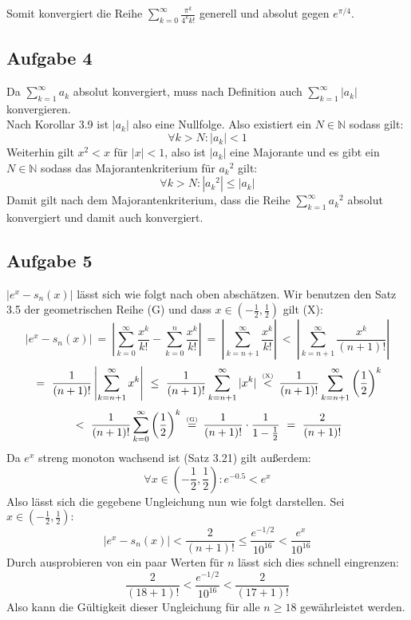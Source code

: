 \documentclass[a4paper,graphics,11pt]{article}
\newcommand{\aufgabe}[1]{\subsection*{Aufgabe #1}}
\newcommand{\up}[2]{\mathrel{\overset{\makebox[0pt]{\mbox{\normalfont\tiny #2}}}{#1}}}
\begin{document}
Somit konvergiert die Reihe $\displaystyle\sum_{k=0}^{\infty} \frac{\pi^k}{4^kk!}$ generell
und absolut gegen $e^{\pi/4}$.
\newpage
\aufgabe{4}
Da $\sum_{k=1}^{\infty} a_k$ absolut konvergiert, muss nach Definition auch
$\sum_{k=1}^{\infty} |a_k|$ konvergieren.\\
Nach Korollar 3.9 ist $|a_k|$ also eine Nullfolge.
Also existiert ein $N \in \mathbb{N}$ sodass gilt:
$$
    \forall k > N \colon |a_k| < 1
$$
Weiterhin gilt $x^2 < x$ für $|x| < 1$, also ist $|a_k|$ eine Majorante und es gibt ein
$N \in \mathbb{N}$ sodass das Majorantenkriterium für ${a_k}^2$ gilt:
$$
    \forall k > N \colon |{a_k}^2| \leq |a_k|
$$
Damit gilt nach dem Majorantenkriterium, dass die Reihe $\sum_{k=1}^{\infty} {a_k}^2$
absolut konvergiert und damit auch konvergiert.
\aufgabe{5}
$|e^x - s_n(x)|$ lässt sich wie folgt 
nach oben abschätzen. Wir benutzen den Satz 3.5 der geometrischen Reihe (G) und
dass $x\in \left(-\frac{1}{2},\frac{1}{2}\right)$ gilt (X):
$$
    |e^x-s_n(x)|
    \ =\ \left|\sum_{k=0}^{\infty} \frac{x^k}{k!} - \sum_{k=0}^{n} \frac{x^k}{k!}\right|
    \ =\ \left|\sum_{k=n+1}^{\infty} \frac{x^k}{k!}\right|
    \ <\ \left|\sum_{k=n+1}^{\infty} \frac{x^k}{(n+1)!}\right|
$$$$
    \ =\ \frac{1}{(n+1)!} \left|\sum_{k=n+1}^{\infty} x^k\right|
    \ \leq\ \frac{1}{(n+1)!} \sum_{k=n+1}^{\infty} |x^k|
    \up{\ <\ }{(X)}\frac{1}{(n+1)!} \sum_{k=n+1}^{\infty} \left(\frac{1}{2}\right)^k
$$$$
    \ <\ \frac{1}{(n+1)!} \sum_{k=0}^{\infty} \left(\frac{1}{2}\right)^k
    \up{\ =\ }{(G)}\frac{1}{(n+1)!}\cdot \frac{1}{1-\frac{1}{2}}
    \ =\ \frac{2}{(n+1)!}
$$
Da $e^x$ streng monoton wachsend ist (Satz 3.21) gilt außerdem:
$$
    \forall x \in \left(-\frac{1}{2}, \frac{1}{2}\right)\colon e^{-0.5} < e^{x}
$$
Also lässt sich die gegebene Ungleichung nun wie folgt darstellen. Sei $x \in \left(-\frac{1}{2}, \frac{1}{2} \right)\colon$
$$
    |e^x - s_n(x)| < \frac{2}{(n+1)!} \leq \frac{e^{-1/2}}{10^{16}} < \frac{e^x}{10^{16}}
$$
Durch ausprobieren von ein paar Werten für $n$ lässt sich dies schnell eingrenzen:
$$
    \frac{2}{(18+1)!} < \frac{e^{-1/2}}{10^{16}} < \frac{2}{(17+1)!}
$$
Also kann die Gültigkeit dieser Ungleichung für alle $n\geq 18$ gewährleistet werden.
\end{document}
